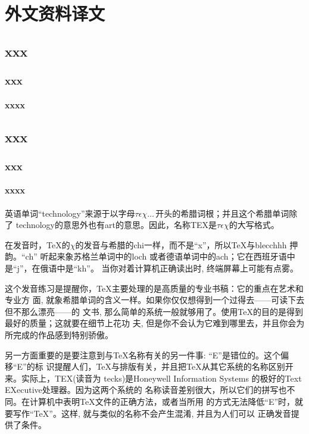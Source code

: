 
\chapter{外文资料译文}
\section{xxx}
\subsection{xxx}
\subsubsection{xxxx}
\section{xxx}
\subsection{xxx}
\subsubsection{xxxx}
英语单词“technology”来源于以字母$\tau\epsilon\chi\ldots\,$开头的希腊词根；并且这个希腊单词除了
technology的意思外也有art的意思。因此，名称TEX是$\tau\epsilon\chi$的大写格式。

在发音时，\TeX 的$\chi$的发音与希腊的chi一样，而不是“x”，所以\TeX 与blecchhh 押韵。“ch”
听起来象苏格兰单词中的loch 或者德语单词中的ach；它在西班牙语中是“j”，在俄语中是“kh”。
当你对着计算机正确读出时, 终端屏幕上可能有点雾。

这个发音练习是提醒你，\TeX 主要处理的是高质量的专业书稿：它的重点在艺术和专业方
面, 就象希腊单词的含义一样。如果你仅仅想得到一个过得去——可读下去但不那么漂亮——的
文书, 那么简单的系统一般就够用了。使用\TeX 的目的是得到最好的质量；这就要在细节上花功
夫, 但是你不会认为它难到哪里去，并且你会为所完成的作品感到特别骄傲。

另一方面重要的是要注意到与\TeX 名称有关的另一件事: “E”是错位的。这个偏移“E”的标
识提醒人们，\TeX 与排版有关，并且把\TeX 从其它系统的名称区别开来。实际上，TEX(读音为
tecks)是Honeywell Information Systems 的极好的Text EXecutive处理器。因为这两个系统的
名称读音差别很大，所以它们的拼写也不同。在计算机中表明\TeX 文件的正确方法，或者当所用
的方式无法降低“E”时，就要写作“TeX”。这样, 就与类似的名称不会产生混淆, 并且为人们可以
正确发音提供了条件。
